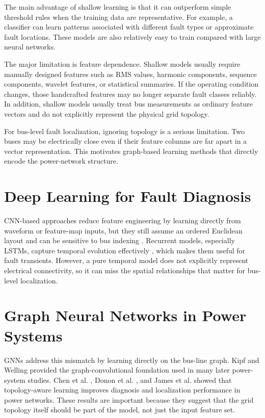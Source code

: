 \documentclass[12pt,a4paper]{article}
\begin{document}
The main advantage of shallow learning is that it can outperform simple threshold rules when the training data are representative. For example, a classifier can learn patterns associated with different fault types or approximate fault locations. These models are also relatively easy to train compared with large neural networks.

The major limitation is feature dependence. Shallow models usually require manually designed features such as RMS values, harmonic components, sequence components, wavelet features, or statistical summaries. If the operating condition changes, those handcrafted features may no longer separate fault classes reliably. In addition, shallow models usually treat bus measurements as ordinary feature vectors and do not explicitly represent the physical grid topology.

For bus-level fault localization, ignoring topology is a serious limitation. Two buses may be electrically close even if their feature columns are far apart in a vector representation. This motivates graph-based learning methods that directly encode the power-network structure.

\section{Deep Learning for Fault Diagnosis}

CNN-based approaches reduce feature engineering by learning directly from waveform or feature-map inputs, but they still assume an ordered Euclidean layout and can be sensitive to bus indexing \cite{owerko2020}. Recurrent models, especially LSTMs, capture temporal evolution effectively \cite{hochreiter1997}, which makes them useful for fault transients. However, a pure temporal model does not explicitly represent electrical connectivity, so it can miss the spatial relationships that matter for bus-level localization.

\section{Graph Neural Networks in Power Systems}

GNNs address this mismatch by learning directly on the bus-line graph. Kipf and Welling \cite{kipf2017} provided the graph-convolutional foundation used in many later power-system studies. Chen et al. \cite{chen2020}, Donon et al. \cite{donon2019}, and James et al. \cite{james2020} showed that topology-aware learning improves diagnosis and localization performance in power networks. These results are important because they suggest that the grid topology itself should be part of the model, not just the input feature set.
\end{document}
